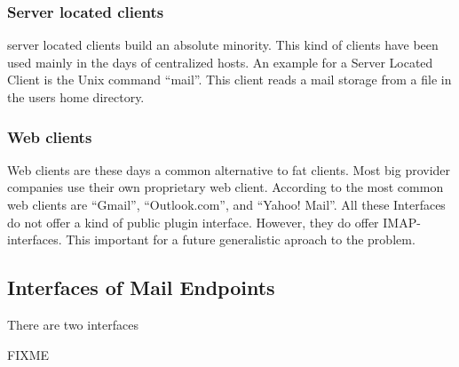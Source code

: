 \subsubsection{Server located clients}
server located clients build an absolute minority. This kind of clients have been used mainly in the days of centralized hosts. An example for a Server Located Client is the Unix command "`mail"'. This client reads a mail storage from a file in the users home directory.

\subsubsection{Web clients}
Web clients are these days a common alternative to fat clients. Most big provider companies use their own proprietary web client. According to \cite{clientDistribution2} the most common web clients are "`Gmail"', "`Outlook.com"', and "`Yahoo! Mail"'. All these Interfaces do not offer a kind of public plugin interface. However,  they do offer IMAP-interfaces. This important for a future generalistic aproach to the problem.

\subsection{Interfaces of Mail Endpoints}
There are two interfaces 

FIXME

